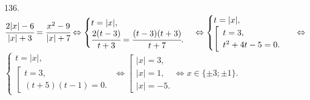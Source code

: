 136. $\cfrac{2|x|-6}{|x|+3}=\cfrac{x^2-9}{|x|+7}\Leftrightarrow \begin{cases} t=|x|,\\ \cfrac{2(t-3)}{t+3}=\cfrac{(t-3)(t+3)}{t+7}. \end{cases}\Leftrightarrow
\begin{cases} t=|x|,\\ \left[\begin{array}{l} t=3,\\ t^2+4t-5=0.\end{array}\right. \end{cases}\Leftrightarrow$\\$
\begin{cases} t=|x|,\\ \left[\begin{array}{l} t=3,\\ (t+5)(t-1)=0.\end{array}\right. \end{cases}\Leftrightarrow
\left[\begin{array}{l} |x|=3,\\ |x|=1,\\ |x|=-5.\end{array}\right.\Leftrightarrow x\in\{\pm 3; \pm1\}.$\\
